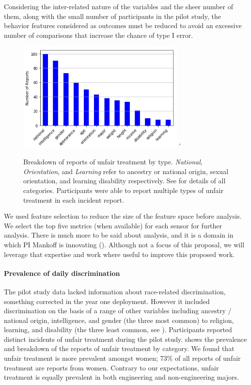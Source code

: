 Considering the inter-related nature of the variables and the sheer number of them, along with the small number of participants in the pilot study, the behavior features considered as outcomes must be reduced to avoid an excessive number of comparisons that increase the chance of type I error. 
\begin{figure}
\vspace{-1.5em}
    \centering
    \includegraphics[width=3.3in]{img/discrimination_breakdown.png}
`    \caption[Unfair treatment type breakdown]{Breakdown of \numdiscriminationeventsfinal reports of unfair treatment by type. \textit{National}, \textit{Orientation}, and \textit{Learning} refer to ancestry or national origin, sexual orientation, and learning disability respectively. See  for details of all categories. Participants were able to report multiple types of unfair treatment in each incident report.
}
    \label{fig:data-discrimination-breakdown}
\end{figure}
We used feature selection to reduce the size of the feature space before analysis. We select the top five metrics (when available) for each sensor for further analysis. There is much more to be said about analysis, and it is a domain in which PI Mankoff is innovating (\eg \cite{DBLP:conf/huc/EarlyFM16,DBLP:conf/chi/BanovicBCMD16,DBLP:conf/huc/KoehlerBOMD14}). Although not a focus of this proposal, we will leverage that expertise and work where useful to improve this proposed work.

\paragraph{Prevalence of daily discrimination}
The pilot study data lacked information about race-related discrimination, something corrected in the year one deployment. However it included discrimination on the basis of a range of other variables including ancestry / national origin, intelligence, and gender (the three most common) to religion, learning, and disability (the three least common, see ). Participants reported \numdiscriminationeventsfinal distinct incidents of unfair treatment during the pilot study.  shows the prevalence and breakdown of the reports of unfair treatment by category. We found that unfair treatment is more prevalent amongst women; 73\% of all reports of unfair treatment are reports from women. Contrary to our expectations, unfair treatment is equally prevalent in both engineering and non-engineering majors. 


